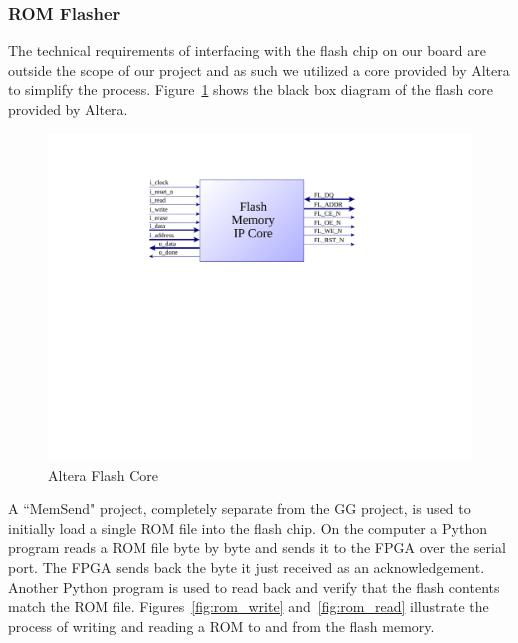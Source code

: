 \documentclass{article}
\begin{document}
\subsubsection{ROM Flasher}
The technical requirements of interfacing with the flash chip on our board are
outside the scope of our project and as such we utilized a core provided by
Altera \cite{flash_core} to simplify the process.  Figure~\ref{fig:flash_core}
shows the black box diagram of the flash core provided by Altera.

\begin{figure}[H]
\centering
\includegraphics[scale=0.5]{../images/flash_core.pdf}
\caption{Altera Flash Core}
\label{fig:flash_core}
\end{figure}

A ``MemSend" project, completely separate from the GG project, is used to
initially load a single ROM file into the flash chip.  On the computer a Python
program reads a ROM file byte by byte and sends it to the FPGA over the serial
port. The FPGA sends back the byte it just received as an acknowledgement.
Another Python program is used to read back and verify that the flash contents
match the ROM file. Figures~\ref{fig:rom_write} and~\ref{fig:rom_read}
illustrate the process of writing and reading a ROM to and from the flash
memory.
\end{document}

